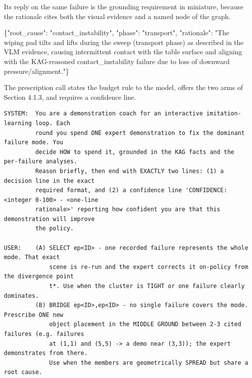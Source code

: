 \documentclass[
  11pt,
]{article}
\newenvironment{Shaded}{}{}
\newcommand{\DataTypeTok}[1]{\textcolor[rgb]{0.56,0.13,0.00}{#1}}
\newcommand{\FunctionTok}[1]{\textcolor[rgb]{0.02,0.16,0.49}{#1}}
\newcommand{\StringTok}[1]{\textcolor[rgb]{0.25,0.44,0.63}{#1}}
\begin{document}
Its reply on the same failure is the grounding requirement in miniature,
because the rationale cites both the visual evidence and a named node of
the graph.

\begin{Shaded}
\begin{Highlighting}[]
\FunctionTok{\{}\DataTypeTok{"root\_cause"}\FunctionTok{:} \StringTok{"contact\_instability"}\FunctionTok{,} \DataTypeTok{"phase"}\FunctionTok{:} \StringTok{"transport"}\FunctionTok{,}
 \DataTypeTok{"rationale"}\FunctionTok{:} \StringTok{"The wiping pad tilts and lifts during the sweep (transport phase) as}
\StringTok{ described in the VLM evidence, causing intermittent contact with the table surface and}
\StringTok{ aligning with the KAG{-}reasoned \textquotesingle{}contact\_instability\textquotesingle{} failure due to loss of downward}
\StringTok{ pressure/alignment."}\FunctionTok{\}}
\end{Highlighting}
\end{Shaded}

The prescription call states the budget rule to the model, offers the
two arms of Section 4.1.3, and requires a confidence line.

\begin{verbatim}
SYSTEM:  You are a demonstration coach for an interactive imitation-learning loop. Each
         round you spend ONE expert demonstration to fix the dominant failure mode. You
         decide HOW to spend it, grounded in the KAG facts and the per-failure analyses.
         Reason briefly, then end with EXACTLY two lines: (1) a decision line in the exact
         required format, and (2) a confidence line 'CONFIDENCE: <integer 0-100> - <one-line
         rationale>' reporting how confident you are that this demonstration will improve
         the policy.

USER:    (A) SELECT ep<ID> - one recorded failure represents the whole mode. That exact
             scene is re-run and the expert corrects it on-policy from the divergence point
             t*. Use when the cluster is TIGHT or one failure clearly dominates.
         (B) BRIDGE ep<ID>,ep<ID> - no single failure covers the mode. Prescribe ONE new
             object placement in the MIDDLE GROUND between 2-3 cited failures (e.g. failures
             at (1,1) and (5,5) -> a demo near (3,3)); the expert demonstrates from there.
             Use when the members are geometrically SPREAD but share a root cause.
\end{verbatim}
\end{document}
